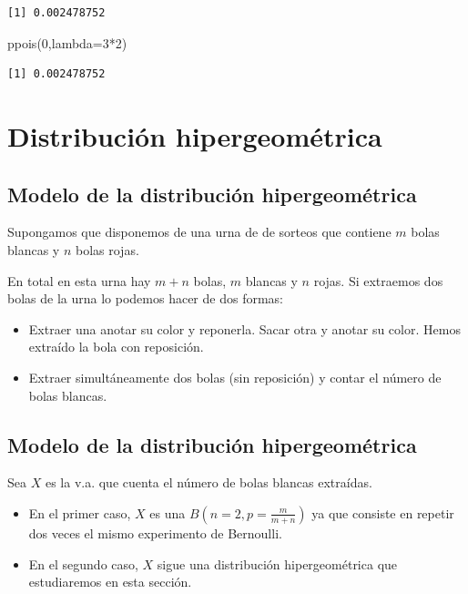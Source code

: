 \documentclass[
  letterpaper,
  DIV=11,
  numbers=noendperiod]{scrreprt}
\newenvironment{Shaded}{\begin{snugshade}}{\end{snugshade}}
\newcommand{\AttributeTok}[1]{\textcolor[rgb]{0.40,0.45,0.13}{#1}}
\newcommand{\DecValTok}[1]{\textcolor[rgb]{0.68,0.00,0.00}{#1}}
\newcommand{\FunctionTok}[1]{\textcolor[rgb]{0.28,0.35,0.67}{#1}}
\newcommand{\NormalTok}[1]{\textcolor[rgb]{0.00,0.23,0.31}{#1}}
\newcommand{\SpecialCharTok}[1]{\textcolor[rgb]{0.37,0.37,0.37}{#1}}
\providecommand{\tightlist}{%
  \setlength{\itemsep}{0pt}\setlength{\parskip}{0pt}}\usepackage{longtable,booktabs,array}
\begin{document}
\begin{verbatim}
[1] 0.002478752
\end{verbatim}

\begin{Shaded}
\begin{Highlighting}[]
\FunctionTok{ppois}\NormalTok{(}\DecValTok{0}\NormalTok{,}\AttributeTok{lambda=}\DecValTok{3}\SpecialCharTok{*}\DecValTok{2}\NormalTok{)}
\end{Highlighting}
\end{Shaded}

\begin{verbatim}
[1] 0.002478752
\end{verbatim}

\chapter{Distribución
hipergeométrica}\label{distribuciuxf3n-hipergeomuxe9trica}

\section{Modelo de la distribución
hipergeométrica}\label{modelo-de-la-distribuciuxf3n-hipergeomuxe9trica}

Supongamos que disponemos de una urna de de sorteos que contiene \(m\)
bolas blancas y \(n\) bolas rojas.

En total en esta urna hay \(m+n\) bolas, \(m\) blancas y \(n\) rojas. Si
extraemos dos bolas de la urna lo podemos hacer de dos formas:

\begin{itemize}
\tightlist
\item
  Extraer una anotar su color y reponerla. Sacar otra y anotar su color.
  Hemos extraído la bola con reposición.
\item
  Extraer simultáneamente dos bolas (sin reposición) y contar el número
  de bolas blancas.
\end{itemize}

\section{Modelo de la distribución
hipergeométrica}\label{modelo-de-la-distribuciuxf3n-hipergeomuxe9trica-1}

Sea \(X\) es la v.a. que cuenta el número de bolas blancas extraídas.

\begin{itemize}
\tightlist
\item
  En el primer caso, \(X\) es una \(B(n=2,p=\frac{m}{m+n})\) ya que
  consiste en repetir dos veces el mismo experimento de Bernoulli.
\item
  En el segundo caso, \(X\) sigue una distribución hipergeométrica que
  estudiaremos en esta sección.
\end{itemize}
\end{document}
